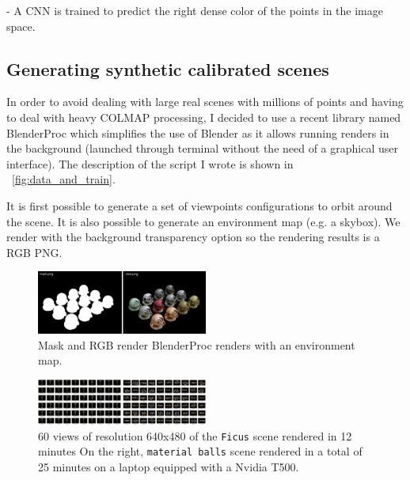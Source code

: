\noindent -  A CNN is trained to predict the right dense color of the points in the image space.


\subsection{Generating synthetic calibrated scenes}
\label{sec:synthetic_calibrated_scenes}
In order to avoid dealing with large real scenes with millions of points and having to deal with heavy COLMAP processing, I decided to use a recent library named BlenderProc  \cite{Denninger2023} which simplifies the use of Blender as it allows running renders in the background (launched through terminal without the need of a graphical user interface).
The description of the script I wrote is shown in ~\cref{fig:data_and_train}.

It is first possible to generate a set of viewpoints configurations to orbit around the scene. It is also possible to generate an environment map (e.g. a skybox). We render with the background transparency option so the rendering results is a RGB PNG. 

\begin{figure}[H]
    \centering
    \includegraphics[width=0.5\textwidth]{figures/blenderproc_renders.png}
    \caption{Mask and RGB render BlenderProc renders with an environment map.}
    \label{fig:blenderproc_renders}
\end{figure}

\begin{figure}[H]
    \centering
    \includegraphics[width=0.5\textwidth]{figures/ficus_and_matballs.png}
    \caption{60 views of resolution 640x480 of the \texttt{Ficus} scene rendered in 12 minutes On the right, \texttt{material balls} scene rendered in a total of 25 minutes on a laptop equipped with a Nvidia T500.}
    \label{fig:multiview}
\end{figure}

